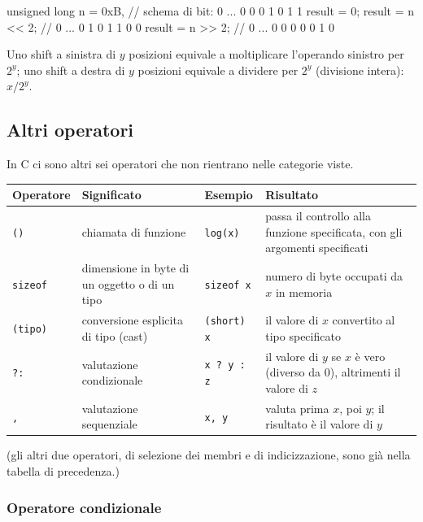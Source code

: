 \documentclass[11pt,a4paper]{article}
\begin{document}
\begin{esempio}
\begin{codice}
unsigned long n = 0xB,   // schema di bit: 0 ... 0 0 0 1 0 1 1
              result = 0;
result = n << 2;         // 0 ... 0 1 0 1 1 0 0
result = n >> 2;         // 0 ... 0 0 0 0 0 1 0
\end{codice}
\end{esempio}

\begin{osservazione}
Uno shift a sinistra di $y$ posizioni equivale a moltiplicare l'operando sinistro per $2^{y}$; uno shift a destra di $y$ posizioni equivale a dividere per $2^{y}$ (divisione intera): $x / 2^{y}$.
\end{osservazione}

\subsection{Altri operatori}

In C ci sono altri sei operatori che non rientrano nelle categorie viste.

\begin{center}
\begin{tabular}{l p{3.6cm} l p{5.2cm}}
\toprule
Operatore & Significato & Esempio & Risultato\\
\midrule
\lstinline|()| & chiamata di funzione & \lstinline|log(x)| & passa il controllo alla funzione specificata, con gli argomenti specificati\\
\lstinline|sizeof| & dimensione in byte di un oggetto o di un tipo & \lstinline|sizeof x| & numero di byte occupati da $x$ in memoria\\
\lstinline|(tipo)| & conversione esplicita di tipo (cast) & \lstinline|(short) x| & il valore di $x$ convertito al tipo specificato\\
\lstinline|?:| & valutazione condizionale & \lstinline|x ? y : z| & il valore di $y$ se $x$ è vero (diverso da $0$), altrimenti il valore di $z$\\
\lstinline|,| & valutazione sequenziale & \lstinline|x, y| & valuta prima $x$, poi $y$; il risultato è il valore di $y$\\
\bottomrule
\end{tabular}
\end{center}
(gli altri due operatori, di selezione dei membri e di indicizzazione, sono già nella tabella di precedenza.)

\subsubsection{Operatore condizionale}
\end{document}
